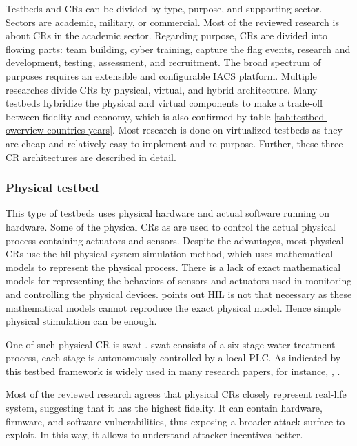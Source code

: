Testbeds and CRs can be divided by type, purpose, and supporting sector. Sectors are academic, military, or commercial. Most of the reviewed research is about CRs in the academic sector. Regarding purpose, CRs are divided into flowing parts: team building, cyber training, capture the flag events, research and development, testing, assessment, and recruitment. The broad spectrum of purposes requires an extensible and configurable IACS platform. Multiple researches \parencite{03-testbeds, 01-surway} divide CRs by physical, virtual, and hybrid architecture. Many testbeds hybridize the physical and virtual components to make a trade-off between fidelity and economy, which is also confirmed by table \ref{tab:testbed-owerview-countries-years}. Most research is done on virtualized testbeds as they are cheap and relatively easy to implement and re-purpose. Further, these three CR architectures are described in detail.

\subsubsection{Physical testbed} \label{ss:physical-testbed}

This type of testbeds uses physical hardware and actual software running on hardware. Some of the physical CRs as \parencite{25-testbed-EPIC, 34-ieee-swat-ics-testbed} are used to control the actual physical process containing actuators and sensors. Despite the advantages, most physical CRs use the \gls*{hil} physical system simulation method, which uses mathematical models to represent the physical process. There is a lack of exact mathematical models for representing the behaviors of sensors and actuators used in monitoring and controlling the physical devices. \citeauthor{35-ten-lessons-ics-testbeds} \parencite{35-ten-lessons-ics-testbeds} points out HIL is not that necessary as these mathematical models cannot reproduce the exact physical model. Hence simple physical stimulation can be enough.

One of such physical CR is \gls*{swat} \parencite{34-ieee-swat-ics-testbed}. \gls*{swat} consists of a six stage water treatment process, each stage is autonomously controlled by a local PLC. As indicated by \citeauthor{01-surway} \parencite{01-surway} this testbed framework is widely used in many research papers, for instance,  \parencite{swat-ref-02},  \parencite{swat-reference-01}.

Most of the reviewed research agrees that physical CRs closely represent real-life system, suggesting that it has the highest fidelity. It can contain hardware, firmware, and software vulnerabilities, thus exposing a broader attack surface to exploit. In this way, it allows to understand attacker incentives better.

